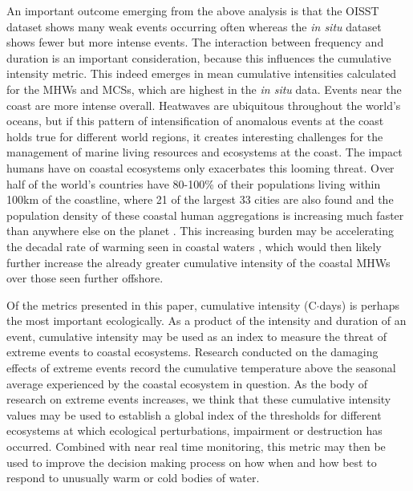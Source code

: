 \documentclass[a4paper,10pt,review]{elsarticle}
\begin{document}
An important outcome emerging from the above analysis is that the OISST dataset shows many weak events occurring often whereas the \emph{in situ} dataset shows fewer but more intense events. The interaction between frequency and duration is an important consideration, because this influences the cumulative intensity metric. This indeed emerges in mean cumulative intensities calculated for the MHWs and MCSs, which are highest in the \emph{in situ} data. Events near the coast are more intense overall. Heatwaves are ubiquitous throughout the world's oceans, but if this pattern of intensification of anomalous events at the coast holds true for different world regions, it creates interesting challenges for the management of marine living resources and ecosystems at the coast. The impact humans have on coastal ecosystems only exacerbates this looming threat. Over half of the world's countries have 80-100\% of their populations living within 100km of the coastline, where 21 of the largest 33 cities are also found and the population density of these coastal human aggregations is increasing much faster than anywhere else on the planet \citep{Martinez2007}. This increasing burden may be accelerating the decadal rate of warming seen in coastal waters \citep{Amos2013}, which would then likely further increase the already greater cumulative intensity of the coastal MHWs over those seen further offshore.

Of the metrics presented in this paper, cumulative intensity (\degree C$\cdot$days) is perhaps the most important ecologically. As a product of the intensity and duration of an event, cumulative intensity may be used as an index to measure the threat of extreme events to coastal ecosystems. Research conducted on the damaging effects of extreme events \citep[e.g.][]{Wernberg2013} record the cumulative temperature above the seasonal average experienced by the coastal ecosystem in question. As the body of research on extreme events increases, we think that these cumulative intensity values may be used to establish a global index of the thresholds for different ecosystems at which ecological perturbations, impairment or destruction has occurred. Combined with near real time monitoring, this metric may then be used to improve the decision making process on how when and how best to respond to unusually warm or cold bodies of water.
\end{document}
